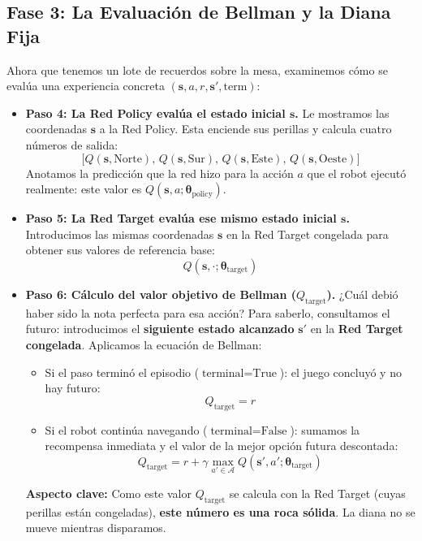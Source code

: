 \subsection{Fase 3: La Evaluación de Bellman y la Diana Fija}
Ahora que tenemos un lote de recuerdos sobre la mesa, examinemos cómo se evalúa una experiencia concreta $(\mathbf{s}, a, r, \mathbf{s}', \text{term})$:
\begin{itemize}
  \item \textbf{Paso 4: La Red Policy evalúa el estado inicial $\mathbf{s}$.} Le mostramos las coordenadas $\mathbf{s}$ a la Red Policy. Esta enciende sus perillas y calcula cuatro números de salida:
  \[
    \big[ Q(\mathbf{s}, \text{Norte}), \, Q(\mathbf{s}, \text{Sur}), \, Q(\mathbf{s}, \text{Este}), \, Q(\mathbf{s}, \text{Oeste}) \big]
  \]
  Anotamos la predicción que la red hizo para la acción $a$ que el robot ejecutó realmente: este valor es $Q(\mathbf{s}, a; \boldsymbol{\theta}_{\text{policy}})$.
  \item \textbf{Paso 5: La Red Target evalúa ese mismo estado inicial $\mathbf{s}$.} Introducimos las mismas coordenadas $\mathbf{s}$ en la Red Target congelada para obtener sus valores de referencia base:
  \[
    Q(\mathbf{s}, \cdot; \boldsymbol{\theta}_{\text{target}})
  \]
  \item \textbf{Paso 6: Cálculo del valor objetivo de Bellman ($Q_{\text{target}}$).} ¿Cuál debió haber sido la nota perfecta para esa acción? Para saberlo, consultamos el futuro: introducimos el \textbf{siguiente estado alcanzado} $\mathbf{s}'$ en la \textbf{Red Target congelada}. Aplicamos la ecuación de Bellman:
  \begin{itemize}
    \item Si el paso terminó el episodio ($\text{terminal} = \text{True}$): el juego concluyó y no hay futuro:
    \begin{equation}
      Q_{\text{target}} = r
    \end{equation}
    \item Si el robot continúa navegando ($\text{terminal} = \text{False}$): sumamos la recompensa inmediata y el valor de la mejor opción futura descontada:
    \begin{equation}
      \label{eq:bellman_q_target_step}
      Q_{\text{target}} = r + \gamma \max_{a' \in \mathcal{A}} Q(\mathbf{s}', a'; \boldsymbol{\theta}_{\text{target}})
    \end{equation}
  \end{itemize}
  \textbf{Aspecto clave:} Como este valor $Q_{\text{target}}$ se calcula con la Red Target (cuyas perillas están congeladas), \textbf{este número es una roca sólida}. La diana no se mueve mientras disparamos.
\end{itemize}

